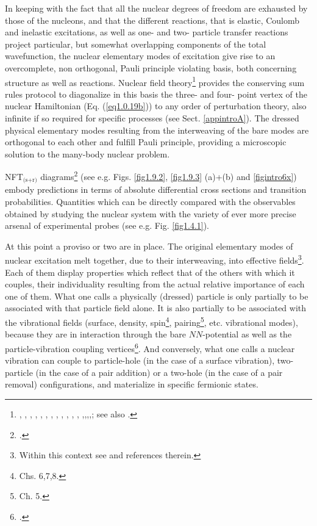 In keeping with the fact that all the nuclear degrees of freedom are exhausted by those of the nucleons, and that the different reactions, that is elastic, Coulomb and inelastic excitations, as well as  one- and two- particle transfer reactions project particular, but somewhat
 overlapping  components of the total wavefunction, the nuclear elementary modes of excitation give  rise to an overcomplete, non orthogonal, Pauli principle violating basis, both concerning structure as well as reactions.  Nuclear field theory\footnote{\cite{Bes:74}, \cite{Bes:76a}, \cite{Bes:76b}, \cite{Bes:76c}, \cite{Bes:75}, \cite{Broglia:76}, \cite{Bes:75b}, \cite{Mottelson:76}, \cite{Bes:77}, \cite{Bortignon:77},  \cite{Bortignon:78}, \cite{Bes:78b}, \cite{Broglia:04a},\cite{Reinhardt:75},\cite{Reinhardt:78a},\cite{Reinhardt:78b},\cite{Reinhardt:80}; see also \cite{Bohr:19}.} provides the conserving sum rules protocol to diagonalize in this basis the three- and four- point vertex  of the nuclear Hamiltonian (Eq. (\ref{eq1.0.19b}))  to any order of perturbation theory, also infinite if so required for specific processes (see Sect. \ref{appintroA}). The dressed physical elementary modes resulting from the interweaving of the bare modes are orthogonal to each other and fulfill Pauli principle, providing a microscopic solution to the many-body nuclear problem.
 
  
 NFT$_{\text{(s+r)}}$ diagrams\footnote{\cite{Broglia:75,Broglia:04a,Broglia:16}.} (see e.g. Figs. \ref{fig1.9.2}, \ref{fig1.9.3} (a)+(b) and  \ref{figintro6x}) embody predictions  in terms of absolute differential cross sections and transition probabilities. Quantities which can be directly compared with the observables obtained by studying the nuclear system with  the variety of ever more precise arsenal of experimental probes (see e.g. Fig. \ref{fig1.4.1}). 

At this point a proviso or two are in place. The original elementary modes of nuclear excitation melt together, due to their interweaving, into effective fields\footnote{Within this context see \cite{Dickhoff:05} and references therein.}. Each of them display properties which reflect that of  the others with which it couples, their individuality resulting from the actual relative importance of each one of them. What one calls a physically  (dressed) particle is only partially to be associated with that particle field alone. It is also partially to be associated with the  vibrational fields
 (surface, density, spin\footnote{\cite{Bertsch:05} Chs. 6,7,8.}, pairing\footnote{\cite{Brink:05} Ch. 5.}, etc. vibrational modes), 
 because they are in interaction through the bare $NN$-potential as well as the particle-vibration coupling vertices\footnote{\cite{Bohr:75}.}. And conversely, what one calls a nuclear vibration can couple to  particle-hole (in the case of a surface vibration),  two-particle (in the case of a pair addition) or a two-hole (in the case of a pair removal)  configurations, and materialize in specific fermionic states. 
 
